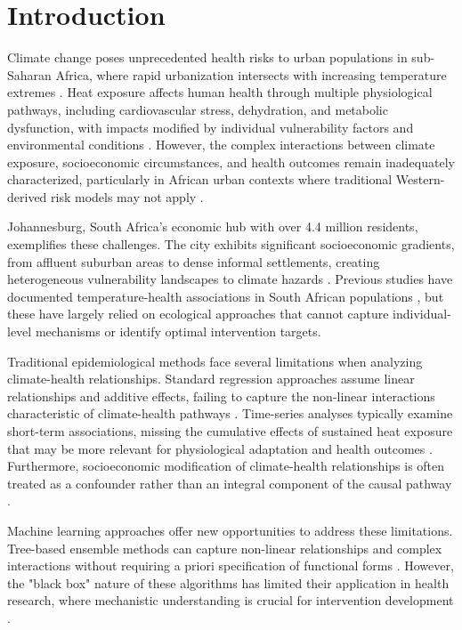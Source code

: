 \documentclass[journal,article,submit,pdftex,moreauthors]{Definitions/mdpi}
\begin{document}
\section{Introduction}

Climate change poses unprecedented health risks to urban populations in sub-Saharan Africa, where rapid urbanization intersects with increasing temperature extremes \cite{watts2021lancet,romanello2022lancet}. Heat exposure affects human health through multiple physiological pathways, including cardiovascular stress, dehydration, and metabolic dysfunction, with impacts modified by individual vulnerability factors and environmental conditions \cite{hajek2022heat,li2022heat}. However, the complex interactions between climate exposure, socioeconomic circumstances, and health outcomes remain inadequately characterized, particularly in African urban contexts where traditional Western-derived risk models may not apply \cite{robinson2021african}.

Johannesburg, South Africa's economic hub with over 4.4 million residents, exemplifies these challenges. The city exhibits significant socioeconomic gradients, from affluent suburban areas to dense informal settlements, creating heterogeneous vulnerability landscapes to climate hazards \cite{maas2016johannesburg}. Previous studies have documented temperature-health associations in South African populations \cite{wright2005time,wichmann2009effects}, but these have largely relied on ecological approaches that cannot capture individual-level mechanisms or identify optimal intervention targets.

Traditional epidemiological methods face several limitations when analyzing climate-health relationships. Standard regression approaches assume linear relationships and additive effects, failing to capture the non-linear interactions characteristic of climate-health pathways \cite{gasparrini2015mortality}. Time-series analyses typically examine short-term associations, missing the cumulative effects of sustained heat exposure that may be more relevant for physiological adaptation and health outcomes \cite{armstrong2014models}. Furthermore, socioeconomic modification of climate-health relationships is often treated as a confounder rather than an integral component of the causal pathway \cite{reid2009mapping}.

Machine learning approaches offer new opportunities to address these limitations. Tree-based ensemble methods can capture non-linear relationships and complex interactions without requiring a priori specification of functional forms \cite{chen2016xgboost,breiman2001random}. However, the "black box" nature of these algorithms has limited their application in health research, where mechanistic understanding is crucial for intervention development \cite{murdoch2019definitions}.
\end{document}
